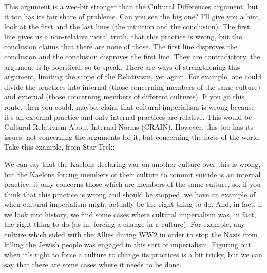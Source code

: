 This argument is a wee-bit stronger than the Cultural  Differences argument, but it too has its fair share of problems. Can you see the big one? I'll give you a hint, look at the first and the last lines (the intuition and the conclusion). The first line gives us a non-relative moral truth, that this practice is wrong, but the conclusion claims that there are none of those. The first line disproves the conclusion and the conclusion disproves the first line. They are contradictory, the argument is hypocritical, so to speak. There are ways of strengthening this argument, limiting the scope of the Relativism, yet again. For example, one could divide the practices into internal (those concerning members of the same culture) and external (those concerning members of different cultures). If you go this route, then you could, maybe, claim that cultural imperialism is wrong because it's an external practice and only internal practices are relative. This would be Cultural Relativism About Internal Norms (CRAIN). However, this too has its issues, not concerning the arguments for it, but concerning the facts of the world. Take this example, from Star Trek:



We can say that the Kaelons declaring war on another culture over this is wrong, but the Kaelons forcing members of their culture to commit suicide is an internal practice, it only concerns those which are members of the same culture, so, if you think that this practice is wrong and should be stopped, we have an example of when cultural imperialism might actually be the right thing to do.  And, in fact, if we look into history, we find some cases where cultural imperialism was, in fact, the right thing to do (as in, forcing a change in a culture). For example, any culture which sided with the Allies during WW2 in order to stop the Nazis from killing the Jewish people was engaged in this sort of imperialism.  Figuring out when it's right to force a culture to change its practices is a bit tricky, but we can say that there are some cases where it needs to be done. 

